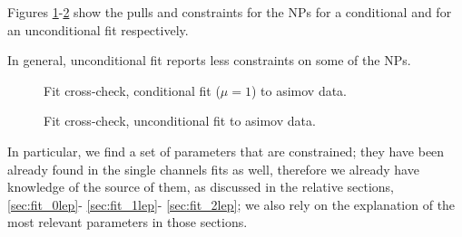 Figures \ref{fig:fit_step0_conditional}-\ref{fig:fit_step0_unconditional}
show the pulls and constraints for the NPs for a conditional and for an unconditional fit respectively.

In general, unconditional fit reports less constraints on some of the NPs.

\begin{figure}[ht]
      \centering
       \caption{Fit cross-check, conditional fit ($\mu=1$) to asimov data.}
       \label{fig:fit_step0_conditional}
\end{figure}

\begin{figure}[ht]
      \centering
       \caption{Fit cross-check, unconditional fit to asimov data.}
       \label{fig:fit_step0_unconditional}
\end{figure}

In particular, we find a set of parameters that are constrained; 
they have been already found in the single channels fits as well, 
therefore we already have knowledge
of the source of them, as discussed in the relative sections, 
\ref{sec:fit_0lep}-
\ref{sec:fit_1lep}-
\ref{sec:fit_2lep};
we also rely on the explanation of the most relevant parameters in those sections.

